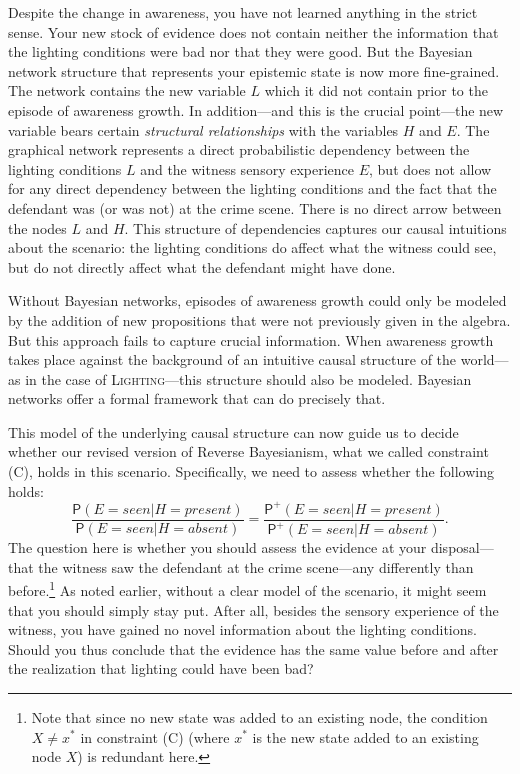 \documentclass[
  11pt,
  dvipsnames,enabledeprecatedfontcommands]{scrartcl}
\newcommand{\pr}[1]{\ensuremath{\mathsf{P}(#1)}}
\newcommand{\ppr}[2]{\ensuremath{\mathsf{P}^{#1}(#2)}}
\begin{document}
Despite the change in awareness, you have not learned anything in the
strict sense. Your new stock of evidence does not contain neither the
information that the lighting conditions were bad nor that they were
good. But the Bayesian network structure that represents your epistemic
state is now more fine-grained. The network contains the new variable
\(L\) which it did not contain prior to the episode of awareness growth.
In addition---and this is the crucial point---the new variable bears
certain \emph{structural relationships} with the variables \(H\) and
\(E\). The graphical network represents a direct probabilistic
dependency between the lighting conditions \(L\) and the witness sensory
experience \(E\), but does not allow for any direct dependency between
the lighting conditions and the fact that the defendant was (or was not)
at the crime scene. There is no direct arrow between the nodes \(L\) and
\(H\). This structure of dependencies captures our causal intuitions
about the scenario: the lighting conditions do affect what the witness
could see, but do not directly affect what the defendant might have
done.

Without Bayesian networks, episodes of awareness growth could only be
modeled by the addition of new propositions that were not previously
given in the algebra. But this approach fails to capture crucial
information. When awareness growth takes place against the background of
an intuitive causal structure of the world---as in the case of
\textsc{Lighting}---this structure should also be modeled. Bayesian
networks offer a formal framework that can do precisely that.

This model of the underlying causal structure can now guide us to decide
whether our revised version of Reverse Bayesianism, what we called
constraint (C), holds in this scenario. Specifically, we need to assess
whether the following holds:
\[\frac{\pr{E=seen \vert H=present}}{\pr{E=seen \vert H=absent}}= \frac{\ppr{+}{E=seen \vert H=present}}{\ppr{+}{E=seen \vert H=absent}}.\]
The question here is whether you should assess the evidence at your
disposal---that the witness saw the defendant at the crime scene---any
differently than before.\footnote{Note that since no new state was added
  to an existing node, the condition \(X\neq x^*\) in constraint (C)
  (where \(x^*\) is the new state added to an existing node \(X\)) is
  redundant here.} As noted earlier, without a clear model of the
scenario, it might seem that you should simply stay put. After all,
besides the sensory experience of the witness, you have gained no novel
information about the lighting conditions. Should you thus conclude that
the evidence has the same value before and after the realization that
lighting could have been bad?
\end{document}
